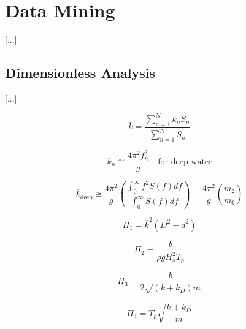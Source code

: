 \chapter{Data Mining}

[...]

\section{Dimensionless Analysis}

[...]

\begin{equation}
	\overline{k} = \frac{\sum_{n=1}^{N}k_nS_n}{\sum_{n=1}^{N}S_n}
	\label{eqn:k_overline}
\end{equation}

\begin{equation}
	k_n \cong \frac{4\pi^2 f_n^2}{g}\quad\textrm{for deep water}
	\label{eqn:k_n_deep}
\end{equation}

\begin{equation}
	\overline{k}_\textrm{deep} \cong \frac{4\pi^2}{g}\left(\frac{\int_{0}^{\infty}f^2S(f)df}{\int_{0}^{\infty}S(f)df}\right) = \frac{4\pi^2}{g}\left(\frac{m_2}{m_0}\right)
	\label{eqn:k_overline_deep}
\end{equation}

\begin{equation}
	\Pi_1 = \overline{k}^2\left(D^2 - d^2\right)
	\label{eqn:Pi_1}
\end{equation}

\begin{equation}
	\Pi_2 = \frac{b}{\rho g H_s^2T_p}
	\label{eqn:Pi_2}
\end{equation}

\begin{equation}
	\Pi_3 = \frac{b}{2\sqrt{(k + k_D)m}}
	\label{eqn:Pi_3}
\end{equation}

\begin{equation}
	\Pi_4 = T_p\sqrt{\frac{k + k_D}{m}}
	\label{eqn:Pi_4}
\end{equation}